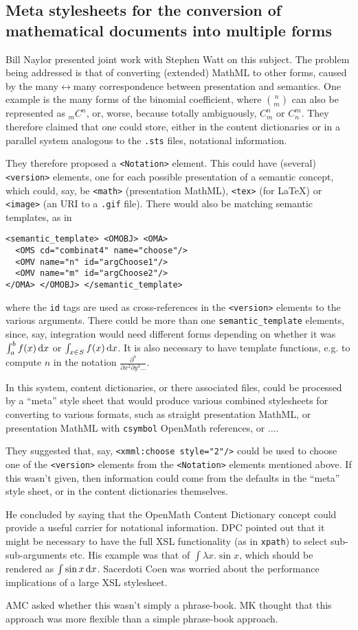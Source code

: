 \documentclass[11pt, a4paper]{article}
\begin{document}
\subsection{Meta stylesheets for the conversion of mathematical documents
into multiple forms}
Bill Naylor presented joint work with Stephen Watt on this subject.
The problem being addressed is that of converting (extended) MathML to
other forms, caused by the many$\leftrightarrow$many correspondence between
presentation and semantics. One example is the many forms of the binomial
coefficient, where $n \choose m$ can also be represented as ${}_mC^n$, or,
worse, because totally ambiguously, $C_m^n$ or $C_n^m$. They therefore
claimed that one could store, either in the content dictionaries or in a
parallel system analogous to the \verb+.sts+ files, notational information.
\par
They therefore proposed a \verb+<Notation>+ element. This could have
(several) \verb+<version>+ elements, one for each possible presentation of
a semantic concept, which could, say, be \verb+<math>+ (presentation
MathML), \verb+<tex>+ (for \LaTeX) or \verb+<image>+ (an URI to a \verb+.gif+
file). There would also be matching semantic templates, as in
\begin{verbatim}
<semantic_template> <OMOBJ> <OMA>
  <OMS cd="combinat4" name="choose"/>
  <OMV name="n" id="argChoose1"/>
  <OMV name="m" id="argChoose2"/>
</OMA> </OMOBJ> </semantic_template>
\end{verbatim}
where the \verb+id+ tags are used as cross-references in the \verb+<version>+
elements to the various arguments. There could be more than one
\verb+semantic_template+ elements, since, say, integration would need
different forms depending on whether it was $\int_a^b f(x)\,{\rm d}x$ or
$\int_{x\in S} f(x)\,{\rm d}x$. It is also necessary to have template
functions, e.g. to compute $n$ in the notation $\frac{\partial^n}{\partial
x^2\partial y^3\ldots}$.
\par
In this system, content dictionaries, or there associated files, could be
processed by a ``meta'' style sheet that would produce various combined
stylesheets for converting to various formats, such as straight
presentation MathML, or presentation MathML with \verb+csymbol+ OpenMath
references, or $\ldots$.
\par
They suggested that, say, \verb+<xmml:choose style="2"/>+ could be used to
choose one of the \verb+<version>+ elements from the \verb+<Notation>+
elements mentioned above. If this wasn't given, then information could come
from the defaults in the ``meta'' style sheet, or in the content
dictionaries themselves. 
\par
He concluded by saying that the OpenMath Content Dictionary concept could
provide a useful carrier for notational information.
DPC pointed out that it might be necessary to have the full XSL
functionality (as in \verb+xpath+) to select sub-sub-arguments etc. His example
was that of $\int\lambda x.\sin x$, which should be rendered as $\int\sin x
\,{\rm d}x$. Sacerdoti Coen was worried about the performance implications
of a large XSL stylesheet.
\par
AMC asked whether this wasn't simply a phrase-book.
MK thought that this approach was more flexible than a simple phrase-book
approach.
\end{document}
